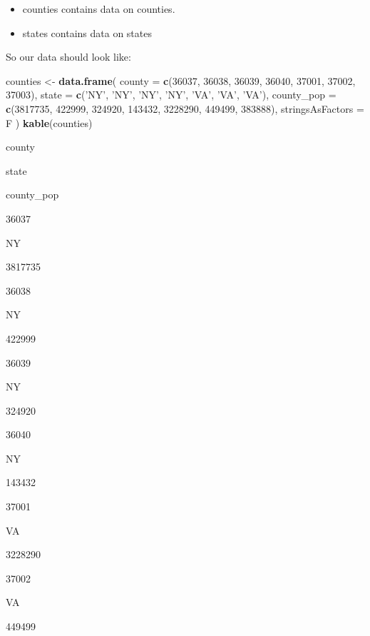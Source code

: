 \documentclass[]{book}
\newenvironment{Shaded}{\begin{snugshade}}{\end{snugshade}}
\newcommand{\KeywordTok}[1]{\textcolor[rgb]{0.13,0.29,0.53}{\textbf{#1}}}
\newcommand{\DataTypeTok}[1]{\textcolor[rgb]{0.13,0.29,0.53}{#1}}
\newcommand{\DecValTok}[1]{\textcolor[rgb]{0.00,0.00,0.81}{#1}}
\newcommand{\StringTok}[1]{\textcolor[rgb]{0.31,0.60,0.02}{#1}}
\newcommand{\NormalTok}[1]{#1}
\providecommand{\tightlist}{%
  \setlength{\itemsep}{0pt}\setlength{\parskip}{0pt}}
\begin{document}
\begin{itemize}
\tightlist
\item
  counties contains data on counties.
\item
  states contains data on states
\end{itemize}

So our data should look like:

\begin{Shaded}
\begin{Highlighting}[]
\NormalTok{counties <-}\StringTok{ }\KeywordTok{data.frame}\NormalTok{(}
  \DataTypeTok{county =} \KeywordTok{c}\NormalTok{(}\DecValTok{36037}\NormalTok{, }\DecValTok{36038}\NormalTok{, }\DecValTok{36039}\NormalTok{, }\DecValTok{36040}\NormalTok{, }\DecValTok{37001}\NormalTok{, }\DecValTok{37002}\NormalTok{, }\DecValTok{37003}\NormalTok{),}
  \DataTypeTok{state =} \KeywordTok{c}\NormalTok{(}\StringTok{'NY'}\NormalTok{, }\StringTok{'NY'}\NormalTok{, }\StringTok{'NY'}\NormalTok{, }\StringTok{'NY'}\NormalTok{, }\StringTok{'VA'}\NormalTok{, }\StringTok{'VA'}\NormalTok{, }\StringTok{'VA'}\NormalTok{),}
  \DataTypeTok{county_pop =} \KeywordTok{c}\NormalTok{(}\DecValTok{3817735}\NormalTok{, }\DecValTok{422999}\NormalTok{, }\DecValTok{324920}\NormalTok{, }\DecValTok{143432}\NormalTok{, }\DecValTok{3228290}\NormalTok{, }\DecValTok{449499}\NormalTok{, }\DecValTok{383888}\NormalTok{), }\DataTypeTok{stringsAsFactors =}\NormalTok{ F}
\NormalTok{)}
\KeywordTok{kable}\NormalTok{(counties)}
\end{Highlighting}
\end{Shaded}

county

state

county\_pop

36037

NY

3817735

36038

NY

422999

36039

NY

324920

36040

NY

143432

37001

VA

3228290

37002

VA

449499
\end{document}
